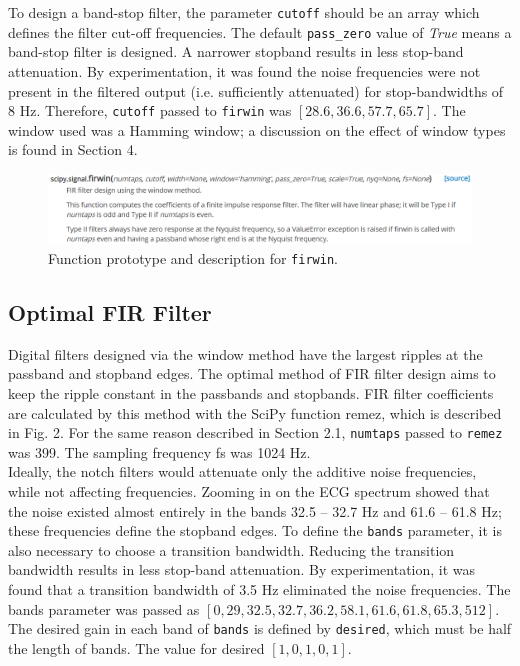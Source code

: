 \documentclass[12pt]{article}
\begin{document}
\noindent To design a band-stop filter, the parameter \texttt{cutoff} should be an array which defines the filter cut-off frequencies. The default
\texttt{pass\_zero} value of \textit{True} means a band-stop filter is designed. A narrower stopband results in less stop-band attenuation. By experimentation,
it was found the noise frequencies were not present in the filtered output (i.e. sufficiently attenuated) for stop-bandwidths of 8 Hz. Therefore,
\texttt{cutoff} passed to \texttt{firwin} was $[28.6, 36.6, 57.7, 65.7]$. The window used was a Hamming window; a discussion on the effect of window types is found in Section 4.

\begin{figure}[H]
    \centering
    \includegraphics[width=\textwidth]{firwin.png}
    \caption{Function prototype and description for \texttt{firwin}.}
    \label{fig:firwin}
\end{figure}

\subsection{Optimal FIR Filter}
Digital filters designed via the window method have the largest ripples at the passband and stopband edges. The optimal method of FIR filter design aims to keep the ripple
constant in the passbands and stopbands. FIR filter coefficients are calculated by this method with the SciPy function remez, which is described in Fig. 2. For the same
reason described in Section 2.1, \texttt{numtaps} passed to \texttt{remez} was 399. The sampling frequency fs was 1024 Hz.\\

\noindent Ideally, the notch filters would attenuate only the additive noise frequencies, while not affecting frequencies. Zooming in on the ECG spectrum showed that
the noise existed almost entirely in the bands 32.5 – 32.7 Hz and 61.6 – 61.8 Hz; these frequencies define the stopband edges. To define the \texttt{bands} parameter, it is
also necessary to choose a transition bandwidth. Reducing the transition bandwidth results in less stop-band attenuation. By experimentation, it was found that a transition
bandwidth of 3.5 Hz eliminated the noise frequencies. The bands parameter was passed as $[0, 29, 32.5, 32.7, 36.2, 58.1, 61.6, 61.8, 65.3, 512]$. The desired gain in each
band of \texttt{bands} is defined by \texttt{desired}, which must be half the length of bands. The value for desired $[1, 0, 1, 0, 1]$.
\end{document}
